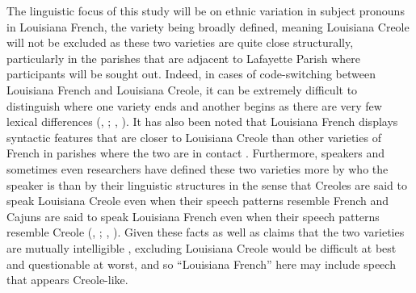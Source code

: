 \documentclass{article}\usepackage[]{graphicx}\usepackage[]{xcolor}
\begin{document}
    The linguistic focus of this study will be on ethnic variation in subject pronouns in Louisiana French, the variety being broadly defined, meaning Louisiana Creole will not be excluded as these two varieties are quite close structurally, particularly in the parishes that are adjacent to Lafayette Parish where participants will be sought out.
    Indeed, in cases of code-switching between Louisiana French and Louisiana Creole, it can be extremely difficult to distinguish where one variety ends and another begins \parencite{klingler_probleme_2005} as there are very few lexical differences (\citeauthor{neumann_creole_1985}, \citeyear[p.~52]{neumann_creole_1985}; \citeauthor[Rottet, 2000, as cited in][]{klingler_probleme_2005}, \citeyear[p.~352]{klingler_probleme_2005}).
    It has also been noted that Louisiana French displays syntactic features that are closer to Louisiana Creole than other varieties of French in parishes where the two are in contact \parencite{baronian_influence_2005}.
    Furthermore, speakers and sometimes even researchers have defined these two varieties more by who the speaker is than by their linguistic structures in the sense that Creoles are said to speak Louisiana Creole even when their speech patterns resemble French and Cajuns are said to speak Louisiana French even when their speech patterns resemble Creole (\citeauthor{brown_pronominal_1988}, \citeyear[p.~5]{brown_pronominal_1988}; \citeauthor{klingler_language_2003}, \citeyear{klingler_language_2003}).
    Given these facts as well as claims that the two varieties are mutually intelligible \parencite[p.~29]{neumann_creole_1985}, excluding Louisiana Creole would be difficult at best and questionable at worst, and so ``Louisiana French'' here may include speech that appears Creole-like.
\end{document}
